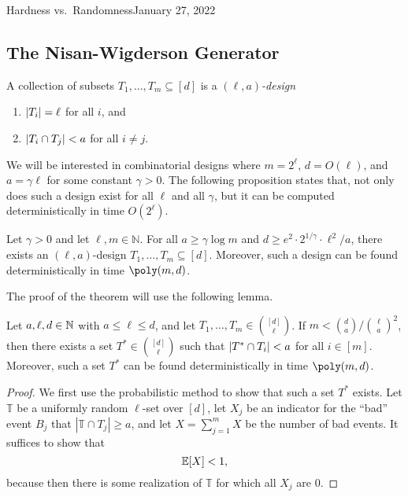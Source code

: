 \begin{lecture}{2}{Hardness vs.\ Randomness}{January 27, 2022}
\subsection{The Nisan-Wigderson Generator}

\begin{definition}
  A collection of subsets $T_1, \dots, T_m \subseteq [d]$ is a \emph{$(\ell, a)$-design}
	\begin{enumerate}
    \item $\lvert T_i\rvert = \ell$ for all $i$, and
		\item $\lvert T_i \cap T_j\rvert < a$ for all $i \ne j$.
	\end{enumerate}
\end{definition}

We will be interested in combinatorial designs where $m = 2^\ell$, $d =
O(\ell)$, and $a = \gamma \ell$ for some constant $\gamma > 0$. The following
proposition states that, not only does such a design exist for all $\ell$ and
all $\gamma$, but it can be computed deterministically in time $O(2^\ell)$.

\begin{theorem}\label{thm:design}
  Let $\gamma > 0 $ and let $\ell, m \in \mathbb{N}$. For all $a \ge \gamma
  \log{m}$ and $d \ge e^2 \cdot 2^{1/\gamma} \cdot \ell^2/a$, there exists an
  $(\ell, a)$-design $T_1, \dots, T_m \subseteq [d]$. Moreover, such a design
  can be found deterministically in time $\poly(m, d)$.
\end{theorem}

The proof of the theorem will use the following lemma.
\begin{lemma}\label{lem:design}
  Let $a, \ell, d \in \mathbb{N}$ with $a \le \ell \le d$, and let $T_1, \dots, T_m \in
  \binom{[d]}{\ell}$. If $m < \binom{d}{a} / \binom{\ell}{a}^2$, then there
  exists a set $T^* \in \binom{[d]}{\ell}$ such that $\lvert T^* \cap T_i\rvert < a$
  for all $i \in [m]$. Moreover, such a set $T^*$ can be found
  deterministically in time $\poly(m, d)$.
\end{lemma}

\begin{proof}
  We first use the probabilistic method to show that such a set $T^*$ exists.
  Let $\mathbb{T}$ be a uniformly random $\ell$-set over $[d]$, let $X_j$
  be an indicator for the ``bad'' event $B_j$ that $|\mathbb{T} \cap T_j| \ge
  a$, and let $X = \sum_{j=1}^m X$ be the number of bad events. It suffices to
  show that \[
    \Exp\brac*{X} < 1,
  \]
  because then there is some realization of $\mathbb{T}$ for which all $X_j$
  are 0.


\end{proof}
\end{lecture}
